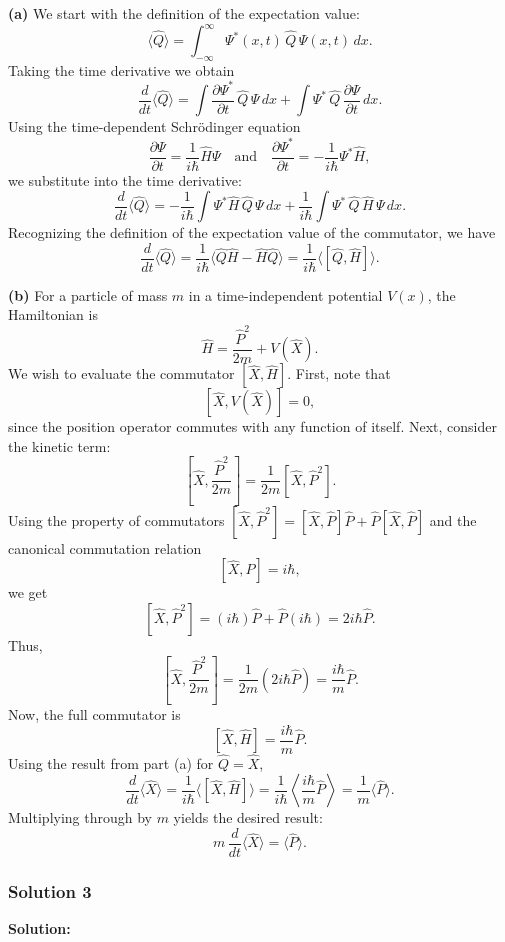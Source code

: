 \documentclass{article}
\begin{document}
\textbf{(a)} We start with the definition of the expectation value:
\[
\langle \hat{Q} \rangle = \int_{-\infty}^{\infty} \Psi^*(x,t)\, \hat{Q}\, \Psi(x,t) \, dx.
\]
Taking the time derivative we obtain
\[
\frac{d}{dt}\langle \hat{Q} \rangle = \int \frac{\partial \Psi^*}{\partial t}\,\hat{Q}\,\Psi \, dx + \int \Psi^*\,\hat{Q}\,\frac{\partial \Psi}{\partial t} \, dx.
\]
Using the time-dependent Schrödinger equation
\[
\frac{\partial \Psi}{\partial t} = \frac{1}{i\hbar}\hat{H}\Psi \quad \text{and} \quad \frac{\partial \Psi^*}{\partial t} = -\frac{1}{i\hbar} \Psi^* \hat{H},
\]
we substitute into the time derivative:
\[
\frac{d}{dt}\langle \hat{Q} \rangle = -\frac{1}{i\hbar}\int \Psi^* \hat{H}\,\hat{Q}\,\Psi\, dx + \frac{1}{i\hbar}\int \Psi^*\,\hat{Q}\,\hat{H}\,\Psi\, dx.
\]
Recognizing the definition of the expectation value of the commutator, we have
\[
\frac{d}{dt}\langle \hat{Q} \rangle = \frac{1}{i\hbar}\langle \hat{Q}\hat{H} - \hat{H}\hat{Q} \rangle = \frac{1}{i\hbar} \langle [\hat{Q}, \hat{H}] \rangle.
\]

\textbf{(b)} For a particle of mass \( m \) in a time-independent potential \( V(x) \), the Hamiltonian is
\[
\hat{H} = \frac{\hat{P}^2}{2m} + V(\hat{X}).
\]
We wish to evaluate the commutator \( [\hat{X}, \hat{H}] \). First, note that
\[
[\hat{X}, V(\hat{X})] = 0,
\]
since the position operator commutes with any function of itself. Next, consider the kinetic term:
\[
\left[\hat{X}, \frac{\hat{P}^2}{2m}\right] = \frac{1}{2m} [\hat{X}, \hat{P}^2].
\]
Using the property of commutators \( [\hat{X}, \hat{P}^2] = [\hat{X}, \hat{P}]\hat{P} + \hat{P}[\hat{X}, \hat{P}] \) and the canonical commutation relation
\[
[\hat{X}, \hat{P}] = i\hbar,
\]
we get
\[
[\hat{X}, \hat{P}^2] = (i\hbar) \hat{P} + \hat{P} (i\hbar) = 2i\hbar \hat{P}.
\]
Thus,
\[
\left[\hat{X}, \frac{\hat{P}^2}{2m}\right] = \frac{1}{2m} (2i\hbar \hat{P}) = \frac{i\hbar}{m} \hat{P}.
\]
Now, the full commutator is
\[
[\hat{X}, \hat{H}] = \frac{i\hbar}{m}\hat{P}.
\]
Using the result from part (a) for \(\hat{Q} = \hat{X}\),
\[
\frac{d}{dt}\langle \hat{X} \rangle = \frac{1}{i\hbar} \langle [\hat{X}, \hat{H}] \rangle = \frac{1}{i\hbar} \left\langle \frac{i\hbar}{m} \hat{P} \right\rangle = \frac{1}{m} \langle \hat{P} \rangle.
\]
Multiplying through by \( m \) yields the desired result:
\[
m\,\frac{d}{dt}\langle \hat{X} \rangle = \langle \hat{P} \rangle.
\]


\subsubsection{Solution 3}
\textbf{Solution:}
\end{document}
